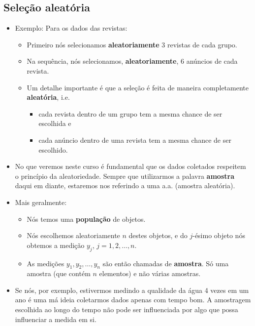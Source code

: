 \documentclass[]{article}
\providecommand{\tightlist}{%
  \setlength{\itemsep}{0pt}\setlength{\parskip}{0pt}}
\begin{document}
\subsection{\texorpdfstring{Seleção
\textbf{aleatória}}{Seleção aleatória}}\label{selecao-aleatoria}

\begin{itemize}
\tightlist
\item
  Exemplo: Para os dados das revistas:

  \begin{itemize}
  \tightlist
  \item
    Primeiro nós selecionamos \textbf{aleatoriamente} 3 revistas de cada
    grupo.
  \item
    Na sequência, nós selecionamos, \textbf{aleatoriamente}, 6 anúncios
    de cada revista.
  \item
    Um detalhe importante é que a seleção é feita de maneira
    completamente \textbf{aleatória}, i.e.

    \begin{itemize}
    \tightlist
    \item
      cada revista dentro de um grupo tem a mesma chance de ser
      escolhida e
    \item
      cada anúncio dentro de uma revista tem a mesma chance de ser
      escolhido.
    \end{itemize}
  \end{itemize}
\item
  No que veremos neste curso é fundamental que os dados coletados
  respeitem o princípio da aleatoriedade. Sempre que utilizarmos a
  palavra \textbf{amostra} daqui em diante, estaremos nos referindo a
  uma a.a. (amostra aleatória).
\item
  Mais geralmente:

  \begin{itemize}
  \tightlist
  \item
    Nós temos uma \textbf{população} de objetos.
  \item
    Nós escolhemos aleatoriamente \(n\) destes objetos, e do \(j\)-ésimo
    objeto nós obtemos a medição \(y_j\), \(j=1,2,\ldots,n\).
  \item
    As medições \(y_1, y_2, \ldots, y_n\) são então chamadas de
    \textbf{amostra}. Só uma amostra (que contém \(n\) elementos) e não
    várias amostras.
  \end{itemize}
\item
  Se nós, por exemplo, estivermos medindo a qualidade da água 4 vezes em
  um ano é uma má ideia coletarmos dados apenas com tempo bom. A
  amostragem escolhida ao longo do tempo não pode ser influenciada por
  algo que possa influenciar a medida em si.
\end{itemize}
\end{document}
